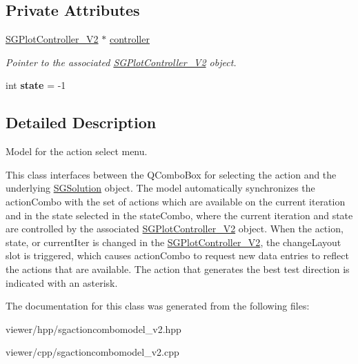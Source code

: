 \subsection*{Private Attributes}
\begin{DoxyCompactItemize}
\item 
\mbox{\label{classSGActionComboModel__V2_a66083a437effed4b59d09910bd556124}} 
\hyperlink{classSGPlotController__V2}{S\+G\+Plot\+Controller\+\_\+\+V2} $\ast$ \hyperlink{classSGActionComboModel__V2_a66083a437effed4b59d09910bd556124}{controller}
\begin{DoxyCompactList}\small\item\em Pointer to the associated \hyperlink{classSGPlotController__V2}{S\+G\+Plot\+Controller\+\_\+\+V2} object. \end{DoxyCompactList}\item 
\mbox{\label{classSGActionComboModel__V2_a57557d54a151590564e8f229ae61ff2e}} 
int {\bfseries state} = -\/1
\end{DoxyCompactItemize}


\subsection{Detailed Description}
Model for the action select menu. 

This class interfaces between the Q\+Combo\+Box for selecting the action and the underlying \hyperlink{classSGSolution}{S\+G\+Solution} object. The model automatically synchronizes the action\+Combo with the set of actions which are available on the current iteration and in the state selected in the state\+Combo, where the current iteration and state are controlled by the associated \hyperlink{classSGPlotController__V2}{S\+G\+Plot\+Controller\+\_\+\+V2} object. When the action, state, or current\+Iter is changed in the \hyperlink{classSGPlotController__V2}{S\+G\+Plot\+Controller\+\_\+\+V2}, the change\+Layout slot is triggered, which causes action\+Combo to request new data entries to reflect the actions that are available. The action that generates the best test direction is indicated with an asterisk. 

The documentation for this class was generated from the following files\+:\begin{DoxyCompactItemize}
\item 
viewer/hpp/sgactioncombomodel\+\_\+v2.\+hpp\item 
viewer/cpp/sgactioncombomodel\+\_\+v2.\+cpp\end{DoxyCompactItemize}
